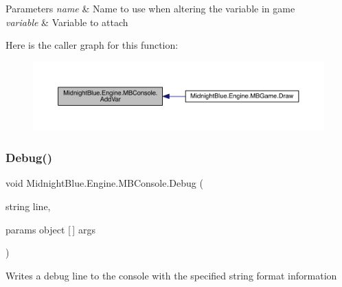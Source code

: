 \begin{DoxyParams}{Parameters}
{\em name} & Name to use when altering the variable in game\\
\hline
{\em variable} & Variable to attach\\
\hline
\end{DoxyParams}
Here is the caller graph for this function\+:
\nopagebreak
\begin{figure}[H]
\begin{center}
\leavevmode
\includegraphics[width=350pt]{class_midnight_blue_1_1_engine_1_1_m_b_console_a7533b96118e74197ac3f3085e026a591_icgraph}
\end{center}
\end{figure}
\hypertarget{class_midnight_blue_1_1_engine_1_1_m_b_console_a99525d45031da45b97230010d767eb0a}{}\label{class_midnight_blue_1_1_engine_1_1_m_b_console_a99525d45031da45b97230010d767eb0a} 
\subsubsection{\texorpdfstring{Debug()}{Debug()}\hspace{0.1cm}{\footnotesize\ttfamily [1/4]}}
{\footnotesize\ttfamily void Midnight\+Blue.\+Engine.\+M\+B\+Console.\+Debug (\begin{DoxyParamCaption}\item[{string}]{line,  }\item[{params object \mbox{[}$\,$\mbox{]}}]{args }\end{DoxyParamCaption})\hspace{0.3cm}{\ttfamily [inline]}}



Writes a debug line to the console with the specified string format information 


